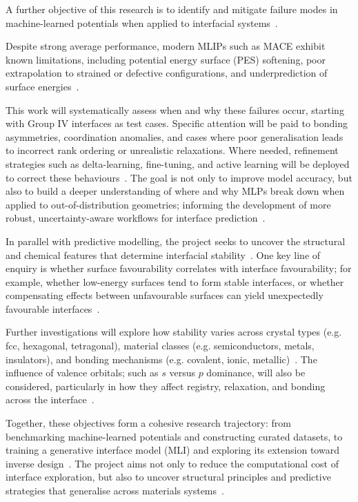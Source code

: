 \label{objectives_failure_modes} A further objective of this research is to identify and mitigate failure modes in machine-learned potentials when applied to interfacial systems~\nocite{}.

Despite strong average performance, modern MLIPs such as MACE exhibit known limitations, including potential energy surface (PES) softening, poor extrapolation to strained or defective configurations, and underprediction of surface energies~\cite{Batzner2022-fd}.

\newpage \label{objectives_failure_diagnostics} This work will systematically assess when and why these failures occur, starting with Group IV interfaces as test cases.
Specific attention will be paid to bonding asymmetries, coordination anomalies, and cases where poor generalisation leads to incorrect rank ordering or unrealistic relaxations.
Where needed, refinement strategies such as delta-learning, fine-tuning, and active learning will be deployed to correct these behaviours~\cite{Pitfield2025-ah}.
The goal is not only to improve model accuracy, but also to build a deeper understanding of where and why MLPs break down when applied to out-of-distribution geometries; informing the development of more robust, uncertainty-aware workflows for interface prediction~\nocite{}.

\label{objectives_structure_insight} In parallel with predictive modelling, the project seeks to uncover the structural and chemical features that determine interfacial stability~\nocite{}.
One key line of enquiry is whether surface favourability correlates with interface favourability; for example, whether low-energy surfaces tend to form stable interfaces, or whether compensating effects between unfavourable surfaces can yield unexpectedly favourable interfaces~\nocite{}.

\label{objectives_structure_analysis} Further investigations will explore how stability varies across crystal types (e.g. fcc, hexagonal, tetragonal), material classes (e.g. semiconductors, metals, insulators), and bonding mechanisms (e.g. covalent, ionic, metallic)~\nocite{}.
The influence of valence orbitals; such as $s$ versus $p$ dominance, will also be considered, particularly in how they affect registry, relaxation, and bonding across the interface~\nocite{}.

\label{objectives_summary} Together, these objectives form a cohesive research trajectory: from benchmarking machine-learned potentials and constructing curated datasets, to training a generative interface model (MLI) and exploring its extension toward inverse design~\nocite{}.
The project aims not only to reduce the computational cost of interface exploration, but also to uncover structural principles and predictive strategies that generalise across materials systems~\nocite{}.

